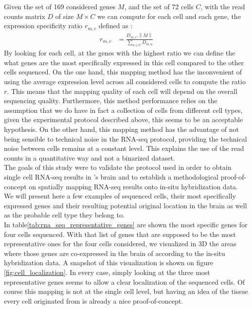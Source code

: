 	Given the set of 169 considered genes $M$, and the set of 72 cells $C$, with the read counts matrix $D$ of size $M\times C$ we can compute for each cell and each gene, the expression specificity ratio $r_{m,c}$ defined as :
\begin{eqnarray*}
	r_{m,c} &= \frac{D_{m,c}.\left\|M\right\|}{\sum_{a \in C}D_{m,a}}
\end{eqnarray*}
By looking for each cell, at the genes with the highest ratio we can define the what genes are the most specifically expressed in  this cell compared to the other cells sequenced. On the one hand, this mapping method has the inconvenient of using the average expression level across all considered cells to compute the ratio $r$. This means that the mapping quality of each cell will depend on the overall sequencing quality. Furthermore, this method performance relies on the assumption that we do have in fact a collection of cells from different cell types, given the experimental protocol described above, this seems to be an acceptable hypothesis. On the other hand, this mapping method has the advantage of not being sensible to technical noise in the RNA-seq protocol, providing the technical noise between cells remains at a constant level. This explains the use of the read counts in a quantitative way and not a binarized dataset.\\

	The goals of this study were to validate the protocol used in order to obtain single cell RNA-seq results in \platy{}'s brain and to establish a methodological proof-of-concept on spatially mapping RNA-seq results onto in-situ hybridization data. We will present here a few examples of sequenced cells, their most specifically expressed genes and their resulting potential original location in the brain as well as the probable cell type they belong to.\\
	
	In table\ref{tab:rna_seq_representative_genes} are shown the most specific genes for four cells sequenced. With that list of genes that are supposed to be the most representative ones for the four cells considered, we visualized in 3D the areas where those genes are co-expressed in the brain of \platy{} according to the in-situ hybridization data. A snapshot of this visualization is shown on figure \ref{fig:cell_localization}. In every case, simply looking at the three most representative genes seems to allow a clear localization of the sequenced cells. Of course this mapping is not at the single cell level, but having an idea of the tissue every cell originated from is already a nice proof-of-concept.\\
	
